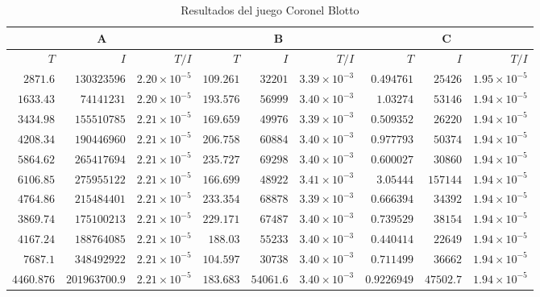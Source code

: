 \begin{table}[ht]
   \scriptsize
    \centering
    \begin{tabular}{r r r | r r r | r r r}
    \multicolumn{3}{c}{A} & \multicolumn{3}{c}{B} & \multicolumn{3}{c}{C} \\ \hline
    $T$ & $I$ & $T/I$ & $T$ & $I$ & $T/I$ & $T$ & $I$ & $T/I$ \\  \hline
    $2871.6$ & $130323596$ & $2.20 {\times} 10 ^{-5}$ & $109.261$ & $32201$ & $3.39 {\times} 10 ^{-3}$ & $0.494761$ & $25426$ & $1.95 {\times} 10 ^{-5}$ \\
$1633.43$ & $74141231$ & $2.20 {\times} 10 ^{-5}$ & $193.576$ & $56999$ & $3.40 {\times} 10 ^{-3}$ & $1.03274$ & $53146$ & $1.94 {\times} 10 ^{-5}$ \\
$3434.98$ & $155510785$ & $2.21 {\times} 10 ^{-5}$ & $169.659$ & $49976$ & $3.39 {\times} 10 ^{-3}$ & $0.509352$ & $26220$ & $1.94 {\times} 10 ^{-5}$ \\
$4208.34$ & $190446960$ & $2.21 {\times} 10 ^{-5}$ & $206.758$ & $60884$ & $3.40 {\times} 10 ^{-3}$ & $0.977793$ & $50374$ & $1.94 {\times} 10 ^{-5}$ \\
$5864.62$ & $265417694$ & $2.21 {\times} 10 ^{-5}$ & $235.727$ & $69298$ & $3.40 {\times} 10 ^{-3}$ & $0.600027$ & $30860$ & $1.94 {\times} 10 ^{-5}$ \\
$6106.85$ & $275955122$ & $2.21 {\times} 10 ^{-5}$ & $166.699$ & $48922$ & $3.41 {\times} 10 ^{-3}$ & $3.05444$ & $157144$ & $1.94 {\times} 10 ^{-5}$ \\
$4764.86$ & $215484401$ & $2.21 {\times} 10 ^{-5}$ & $233.354$ & $68878$ & $3.39 {\times} 10 ^{-3}$ & $0.666394$ & $34392$ & $1.94 {\times} 10 ^{-5}$ \\
$3869.74$ & $175100213$ & $2.21 {\times} 10 ^{-5}$ & $229.171$ & $67487$ & $3.40 {\times} 10 ^{-3}$ & $0.739529$ & $38154$ & $1.94 {\times} 10 ^{-5}$ \\
$4167.24$ & $188764085$ & $2.21 {\times} 10 ^{-5}$ & $188.03$ & $55233$ & $3.40 {\times} 10 ^{-3}$ & $0.440414$ & $22649$ & $1.94 {\times} 10 ^{-5}$ \\
$7687.1$ & $348492922$ & $2.21 {\times} 10 ^{-5}$ & $104.597$ & $30738$ & $3.40 {\times} 10 ^{-3}$ & $0.711499$ & $36662$ & $1.94 {\times} 10 ^{-5}$ \\ \hline
$4460.876$ & $201963700.9$ & $2.21 {\times} 10 ^{-5}$ &
$183.683$ & $54061.6$ & $3.40 {\times} 10 ^{-3}$ & $0.9226949$ & $47502.7$ & $1.94 {\times} 10 ^{-5}$ \\ \hline
    \end{tabular}
    \caption{Resultados del juego Coronel Blotto}
    \label{tab:resultados-coronel-blotto}
\end{table}


